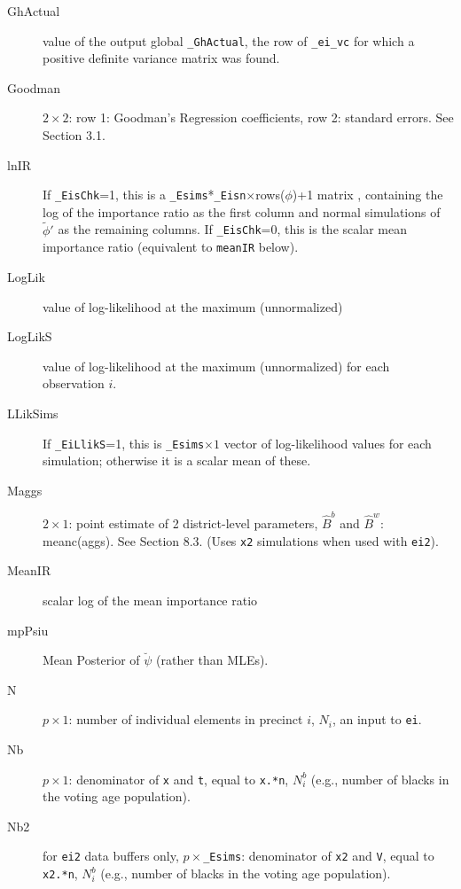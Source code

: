 \documentclass[11pt,titlepage]{article}
\newcommand{\psiu}{\breve{\psi}}
\newcommand{\Nbp}{{N_i^{b}}}
\newcommand{\Npp}{{N_i}}
\begin{document}
\begin{description}
\item[GhActual] value of the output global \texttt{\_GhActual}, the
  row of \texttt{\_ei\_vc} for which a positive definite variance
  matrix was found.

\item[Goodman] $2\times 2$: row 1: Goodman's Regression coefficients,
  row 2: standard errors.  See Section 3.1.

\item[lnIR] If \texttt{\_EisChk}=1, this is a
  \texttt{\_Esims}*\texttt{\_Eisn}$\times$rows($\phi$)+1 matrix ,
  containing the log of the importance ratio as the first column and
  normal simulations of $\tilde{\phi}'$ as the remaining columns.  If
  \texttt{\_EisChk}=0, this is the scalar mean importance ratio
  (equivalent to \texttt{meanIR} below).

\item[LogLik] value of log-likelihood at the maximum (unnormalized)

\item[LogLikS] value of log-likelihood at the maximum (unnormalized)
  for each observation $i$.

\item[LLikSims] If \texttt{\_EiLlikS}=1, this is \texttt{\_Esims}$\times
  1$ vector of log-likelihood values for each simulation; otherwise it
  is a scalar mean of these.

\item[Maggs] $2\times 1$: point estimate of 2 district-level
  parameters, $\hat{B}^b$ and $\hat{B}^w$: meanc(aggs).  See Section
  8.3.  (Uses \texttt{x2} simulations when used with \texttt{ei2}).

\item[MeanIR] scalar log of the mean importance ratio

\item[mpPsiu] Mean Posterior of $\psiu$ (rather than MLEs).

\item[N] $p\times 1$: number of individual elements in precinct $i$,
  $\Npp$, an input to \texttt{ei}.

\item[Nb] $p\times 1$: denominator of \texttt{x} and \texttt{t},
  equal to \texttt{x.*n}, $\Nbp$ (e.g., number of blacks in the
  voting age population).

\item[Nb2] for \texttt{ei2} data buffers only,
  $p\times$\texttt{\_Esims}: denominator of \texttt{x2} and
  \texttt{V}, equal to \texttt{x2.*n}, $\Nbp$ (e.g., number of blacks
  in the voting age population).


\end{description}
\end{document}
